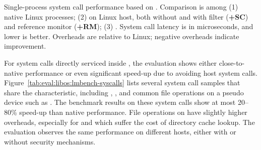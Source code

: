 \label{sec:eval:libos:syscalls}


\begin{table}[t!b!]

\caption{Single-process system call performance based on \lmbench{}. Comparison is among (1) native Linux processes; (2) \graphene{} on Linux host, both without and with \seccomp{} filter ({\bf +SC}) and reference monitor ({\bf +RM}); (3) \graphenesgx{}.
System call latency is in microseconds, and lower is better.
Overheads are relative to Linux; negative overheads indicate improvement.} 
\label{tab:eval:libos:lmbench-syscalls}
\end{table}



For system calls directly serviced
inside \thelibos{},
the evaluation shows either close-to-native performance
or even significant speed-up
due to avoiding host system calls.
Figure~\ref{tab:eval:libos:lmbench-syscalls}
lists several system call samples that share the characteristic,
including ,
, and common file operations on a pseudo device such as .
The benchmark results on these system calls
show at most 20--80\% speed-up
than native performance.
File operations on  have
slightly higher overheads,
especially for  and 
which suffer the cost
of directory cache lookup.
The evaluation observes the same performance
on different hosts, either with or without
security mechanisms.






